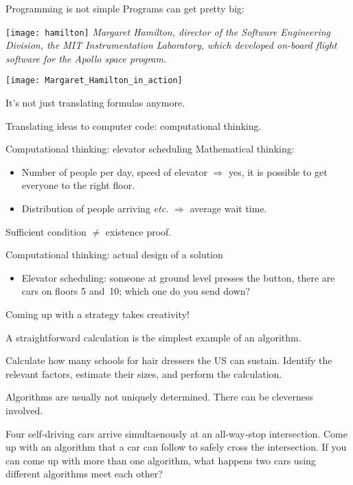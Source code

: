 \begin{block}{Programming is not simple}
  \label{sl:hamilton}
  Programs can get pretty big:

  \begin{multicols}{2}
    \texttt{[image: hamilton]}
    \vfill\columnbreak
    \textsl
    {\small Margaret Hamilton, director of the Software Engineering Division,
    the MIT Instrumentation Laboratory, which developed on-board
    flight software for the Apollo space program.}\par
    \texttt{[image: Margaret\_Hamilton\_in\_action]}
    \vfill\hbox{}\columnbreak
  \end{multicols}

  It's not just translating formulas anymore.

  Translating ideas to computer code: computational thinking.
\end{block}

\begin{block}{Computational thinking: elevator scheduling}
  \label{sl:elevator}
  Mathematical thinking:
  \begin{itemize}
  \item Number of people per day, speed of elevator $\Rightarrow$ yes,
    it is possible to get everyone to the right floor.
  \item Distribution of people arriving \emph{etc.} $\Rightarrow$
    average wait time.
  \end{itemize}
  Sufficient condition $\not=$ existence proof.

  Computational thinking: actual design of a solution
  \begin{itemize}
  \item Elevator scheduling: someone at ground level presses the
    button, there are cars on floors 5 and~10; which one do you send down?
  \end{itemize}
  Coming up with a strategy takes creativity!
\end{block}

\begin{exercise}
  \label{ex:hair}
  A straightforward calculation is the simplest example of an
  algorithm.

  Calculate how many schools for hair dressers the US can
  sustain. Identify the relevant factors, estimate their sizes, and
  perform the calculation.
\end{exercise}

\begin{exercise}
  \label{ex:googlecar}
  Algorithms are usually not uniquely determined. There can be
  cleverness involved.

  Four self-driving cars arrive simultaenously at an all-way-stop intersection. Come
  up with an algorithm that a car can follow to safely cross the
  intersection. If you can come up with more than one algorithm, what
  happens two cars using different algorithms meet each other?
\end{exercise}

